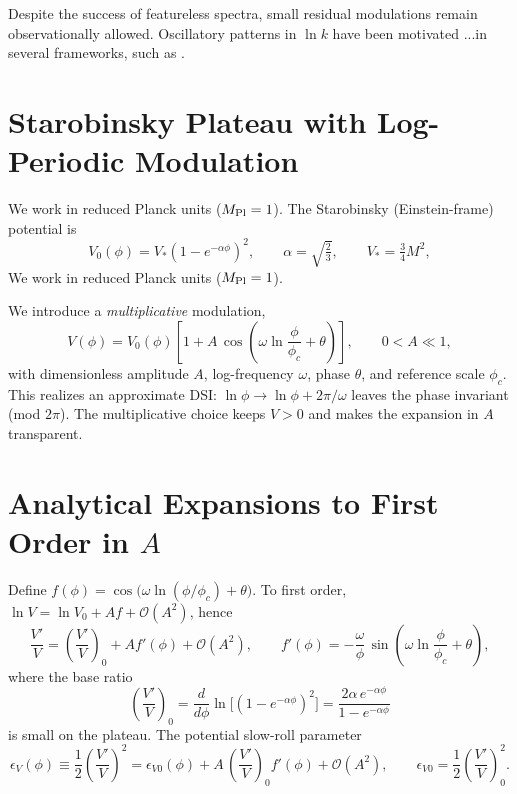 \documentclass[12pt]{article}
\begin{document}
Despite the success of featureless spectra, small residual modulations remain observationally allowed. Oscillatory patterns in $\ln k$ have been motivated ...in several frameworks, such as \cite{CalcagniKuroyanagi2023}.


\section{Starobinsky Plateau with Log-Periodic Modulation}
\label{sec:theory}

We work in reduced Planck units ($M_{\rm Pl}=1$). The Starobinsky (Einstein-frame) potential is
\begin{equation}
V_0(\phi) = V_* \left(1 - e^{-\alpha \phi}\right)^2,
\qquad \alpha = \sqrt{\tfrac{2}{3}}, \qquad 
V_* = \tfrac{3}{4} M^2,
\end{equation}
We work in reduced Planck units ($M_{\rm Pl}=1$).


We introduce a \emph{multiplicative} modulation,
\begin{equation}
V(\phi)=V_0(\phi)\left[1+A\,\cos\!\left(\omega \ln\frac{\phi}{\phi_c}+\theta\right)\right],
\qquad 0<A\ll 1,
\label{eq:Vmod}
\end{equation}
with dimensionless amplitude $A$, log-frequency $\omega$, phase $\theta$, and reference scale $\phi_c$. This realizes an approximate DSI: $\ln\phi\to \ln\phi+2\pi/\omega$ leaves the phase invariant (mod $2\pi$). The multiplicative choice keeps $V>0$ and makes the expansion in $A$ transparent.


\section{Analytical Expansions to First Order in \texorpdfstring{$A$}{A}}
\label{sec:analytics}

Define $f(\phi)=\cos\big(\omega\ln(\phi/\phi_c)+\theta\big)$. To first order, $\ln V=\ln V_0+A f+\mathcal{O}(A^2)$, hence
\begin{equation}
\frac{V'}{V}
=\left(\frac{V'}{V}\right)_0 + A f'(\phi)+\mathcal{O}(A^2),
\qquad
f'(\phi)=-\frac{\omega}{\phi}\,\sin\!\left(\omega\ln\frac{\phi}{\phi_c}+\theta\right),
\label{eq:VprimeOverV}
\end{equation}
where the base ratio
\begin{equation}
\left(\frac{V'}{V}\right)_0
=\frac{d}{d\phi}\ln\Big[(1-e^{-\alpha\phi})^2\Big]
=\frac{2\alpha\,e^{-\alpha\phi}}{1-e^{-\alpha\phi}}
\label{eq:Xbase}
\end{equation}
is small on the plateau. The potential slow-roll parameter
\begin{equation}
\epsilon_V(\phi)\equiv \frac12\left(\frac{V'}{V}\right)^2
=\epsilon_{V0}(\phi)+A\,\left(\frac{V'}{V}\right)_0 f'(\phi)+\mathcal{O}(A^2),\qquad 
\epsilon_{V0}=\frac12\left(\frac{V'}{V}\right)_0^2.
\label{eq:epsV}
\end{equation}
\end{document}
